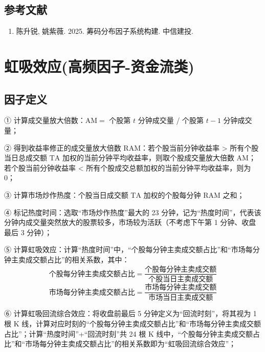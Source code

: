 \documentclass{article}
\begin{document}
\subsection{参考文献}
\begin{enumerate}
    \item 陈升锐, 姚紫薇. 2025. 筹码分布因子系统构建. 中信建投.
\end{enumerate}

\section{虹吸效应(高频因子-资金流类)}

\subsection{因子定义}

① 计算成交量放大倍数：\( \mathrm{AM} = \) 个股第 \( t \) 分钟成交量 / 个股第 \( t-1 \) 分钟成交量；

② 得到收益率修正的成交量放大倍数 \( \mathrm{RAM} \)：若个股当前分钟收益率 > 所有个股当日总成交额 \( \mathrm{TA} \) 加权的当前分钟平均收益率，则取个股成交量放大倍数 \( \mathrm{AM} \)；若个股当前分钟收益率 < 所有个股成交总额加权的当前分钟平均收益率，则为 0；

③ 计算市场炒作热度：个股当日成交额 \( \mathrm{TA} \) 加权的个股每分钟 \( \mathrm{RAM} \) 之和；

④ 标记热度时间：选取“市场炒作热度”最大的 23 分钟，记为“热度时间”，代表该分钟内成交量突然放大的股票较多，市场较为活跃（不考虑下午第 1 分钟、收盘最后 3 分钟）；

⑤ 计算虹吸效应：计算“热度时间”中，“个股每分钟主卖成交额占比”和“市场每分钟主卖成交额占比”的相关系数，其中：
    \begin{equation*}
        \text{个股每分钟主卖成交额占比} = \frac{\text{个股每分钟主卖成交额}}{\text{个股当日主卖成交额}}
    \end{equation*}
    \begin{equation*}
        \text{市场每分钟主卖成交额占比} = \frac{\text{市场每分钟主卖成交额}}{\text{市场当日主卖成交额}}
    \end{equation*}

⑥ 计算虹吸回流综合效应：将收盘前最后 5 分钟定义为“回流时刻”，将其视为 1 根 K 线，计算对应时刻的“个股每分钟主卖成交额占比”和“市场每分钟主卖成交额占比”；计算“热度时间”+“回流时刻”共 24 根 K 线中，“个股每分钟主卖成交额占比”和“市场每分钟主卖成交额占比”的相关系数即为“虹吸回流综合效应”；
\end{document}
